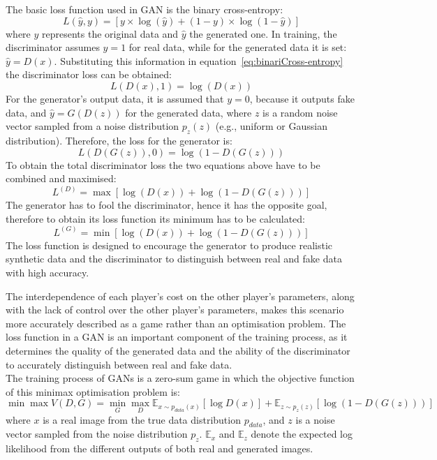 \noindent The basic loss function used in GAN is the binary cross-entropy:
\begin{equation}
\label{eq:binariCross-entropy}
L(\hat{y}, y) = [y \times \log (\hat{y}) + (1-y)\times \log (1-\hat{y})]
\end{equation}
where $y$ represents the original data and $\hat{y}$ the generated one. In training, the discriminator assumes $y=1$ for real data, while for the generated data it is set: $\hat{y} = D(x)$. Substituting this information in equation~\ref{eq:binariCross-entropy} the discriminator loss can be obtained: 
\begin{equation}
    L(D(x),1)=\log(D(x))
\end{equation}
For the generator's output data, it is assumed that $y = 0$, because it outputs fake data, and $\hat{y} = G(D(z))$ for the generated data, where $z$ is a random noise vector sampled from a noise distribution $p_z(z)$ (e.g., uniform or Gaussian distribution). Therefore, the loss for the generator is:
\begin{equation}
    L(D(G(z)),0) = \log(1 - D(G(z)))
\end{equation}
To obtain the total discriminator loss the two equations above have to be combined and maximised:
\begin{equation}
L^{(D)}=\max [\log (D(x)) + \log(1-D(G(z)))]
\end{equation}
The generator has to fool the discriminator, hence it has the opposite goal, therefore to obtain its loss function its minimum has to be calculated:
\begin{equation}
L^{(G)}=\min [\log (D(x)) + \log(1-D(G(z)))]
\end{equation}
The loss function is designed to encourage the generator to produce realistic synthetic data and the discriminator to distinguish between real and fake data with high accuracy.

\noindent The interdependence of each player's cost on the other player's parameters, along with the lack of control over the other player's parameters, makes this scenario more accurately described as a game rather than an optimisation problem. 
The loss function in a GAN is an important component of the training process, as it determines the quality of the generated data and the ability of the discriminator to accurately distinguish between real and fake data. 
\\
\noindent The training process of GANs is a zero-sum game in which the objective function of this minimax optimisation problem is:
\begin{equation}
\label{eq:minimax obj function}
    \min \max V(D,G) = \min_G \max_D \mathbb{E}_{x \sim p_{data}(x)}[\log D(x)]+\mathbb{E}_{z \sim p_z(z)}[\log (1- D(G(z)))]
\end{equation}
where $x$ is a real image from the true data distribution $p_{data}$, and $z$ is a noise vector sampled from the noise distribution $p_z$. $\mathbb{E}_x$ and $\mathbb{E}_z$ denote the expected log likelihood from the different outputs of both real and generated images.

